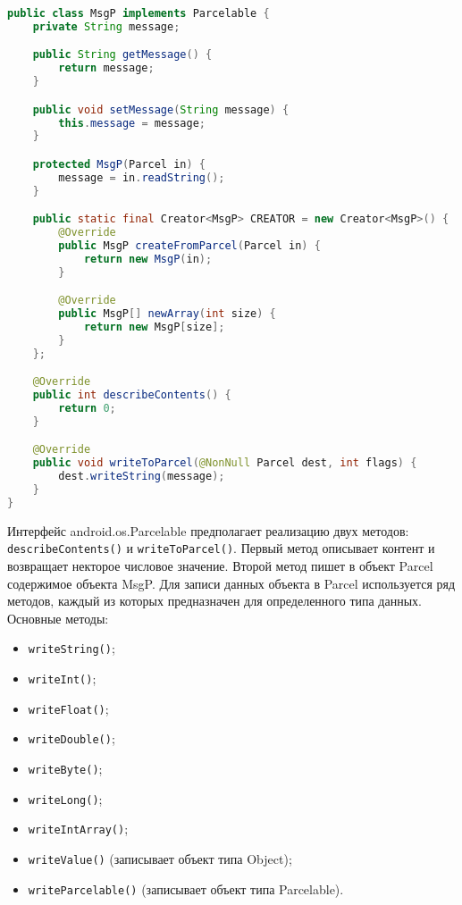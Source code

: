 \begin{lstlisting}[language=Java
	, caption=\leftline{}
	, label=lst:model:parcelable
	]
public class MsgP implements Parcelable {
	private String message;

	public String getMessage() {
		return message;
	}

	public void setMessage(String message) {
		this.message = message;
	}

	protected MsgP(Parcel in) {
		message = in.readString();
	}

	public static final Creator<MsgP> CREATOR = new Creator<MsgP>() {
		@Override
		public MsgP createFromParcel(Parcel in) {
			return new MsgP(in);
		}

		@Override
		public MsgP[] newArray(int size) {
			return new MsgP[size];
		}
	};

	@Override
	public int describeContents() {
		return 0;
	}

	@Override
	public void writeToParcel(@NonNull Parcel dest, int flags) {
		dest.writeString(message);
	}
}
\end{lstlisting}

Интерфейс android.os.Parcelable предполагает реализацию двух методов:
\texttt{describeContents()} и \texttt{writeToParcel()}.
Первый метод описывает контент и возвращает некторое числовое значение.
Второй метод пишет в объект Parcel содержимое объекта MsgP.
Для записи данных объекта в Parcel используется ряд методов, каждый из
которых предназначен для определенного типа данных. Основные методы:
\begin{itemize}
	\item \texttt{writeString()};
	\item \texttt{writeInt()};
	\item \texttt{writeFloat()};
	\item \texttt{writeDouble()};
	\item \texttt{writeByte()};
	\item \texttt{writeLong()};
	\item \texttt{writeIntArray()};
	\item \texttt{writeValue()} (записывает объект типа Object);
	\item \texttt{writeParcelable()} (записывает объект типа Parcelable).
\end{itemize}

